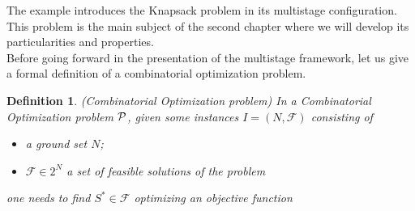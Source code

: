 \documentclass[a4paper]{book}
\newtheorem{definition}{Definition}
\begin{document}
The example introduces the {\sc Knapsack} problem in its multistage configuration. This problem is the main subject of the second chapter where we will develop its particularities and properties.\\

Before going forward in the presentation of the multistage framework, let us give a formal definition of a combinatorial optimization problem.

\begin{definition}{\emph{(Combinatorial Optimization problem)}} In a Combinatorial Optimization problem $\cal P$, given some instances $I = (N, \mathcal{F})$  consisting of
\begin{itemize}
    \item a ground set $N$;
    \item $\mathcal{F}\in 2^N$ a set of feasible solutions of the problem 
\end{itemize}
one needs to find $S^* \in \mathcal{F}$ optimizing an objective function
\end{definition}
\end{document}
